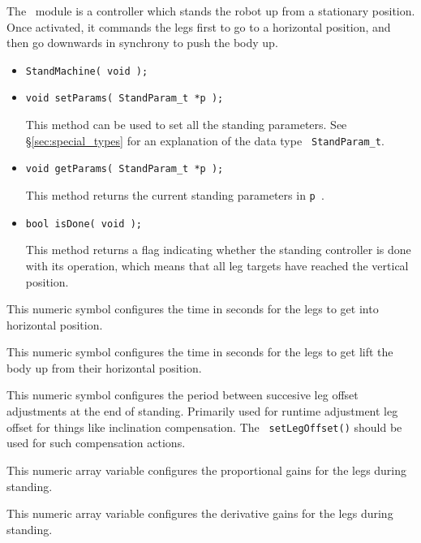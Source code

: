 \begin{moduleheader}
\classname{\StandMachine} \mline
\modulebase{\StateMachine} \mline
{} \mline
{}
\end{moduleheader}

The \StandMachine\ module is a controller which stands the robot up from a
stationary position. Once activated, it commands the legs first to go to a
horizontal position, and then go downwards in synchrony to push the body
up. \\

\constructors

\begin{itemize}
\item{\tt StandMachine( void ); }
\end{itemize}

\localinterface

\begin{itemize}
\item{\tt void setParams( StandParam\_t *p ); } \par
This method can be used to set all the standing parameters. See
\S\ref{sec:special_types} for an explanation of the data type {\tt
  StandParam\_t}.
\item{\tt void getParams( StandParam\_t *p ); } \par
This method returns the current standing parameters in {\tt *p }.
\item{\tt bool isDone( void ); } \par
This method returns a flag indicating whether the standing controller
is done with its operation, which means that all leg targets have
reached the vertical position.
\end{itemize}

\configsymbols

\begin{itemize}
\par
This numeric symbol configures the time in seconds for the legs to get into
horizontal position.
\par
This numeric symbol configures the time in seconds for the legs to get lift
the body up from their horizontal position.
\par
This numeric symbol configures the period between succesive leg offset
adjustments at the end of standing. Primarily used for runtime adjustment
leg offset for things like inclination compensation. The {\tt
  setLegOffset()} should be used for such compensation actions.
\par
This numeric array variable configures the proportional gains for the legs
during standing.
\par
This numeric array variable configures the derivative gains for the legs
during standing.
\end{itemize}

